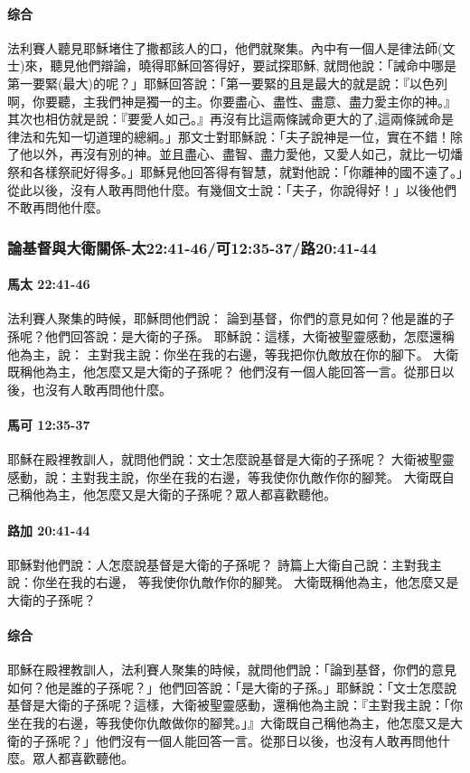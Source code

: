 \paragraph{综合}
法利賽人聽見耶穌堵住了撒都該人的口，他們就聚集。內中有一個人是律法師(文士)來，聽見他們辯論，曉得耶穌回答得好，要試探耶穌, 就問他說：「誡命中哪是第一要緊(最大)的呢？」耶穌回答說：「第一要緊的且是最大的就是說：『以色列啊，你要聽，主我們神是獨一的主。你要盡心、盡性、盡意、盡力愛主你的神。』其次也相仿就是說：『要愛人如己。』再沒有比這兩條誡命更大的了,這兩條誡命是律法和先知一切道理的總綱。」那文士對耶穌說：「夫子說神是一位，實在不錯！除了他以外，再沒有別的神。並且盡心、盡智、盡力愛他，又愛人如己，就比一切燔祭和各樣祭祀好得多。」耶穌見他回答得有智慧，就對他說：「你離神的國不遠了。」從此以後，沒有人敢再問他什麼。有幾個文士說：「夫子，你說得好！」以後他們不敢再問他什麼。


\subsubsection{論基督與大衛關係-太22:41-46/可12:35-37/路20:41-44}
\paragraph{馬太 22:41-46}
法利賽人聚集的時候，耶穌問他們說：
論到基督，你們的意見如何？他是誰的子孫呢？他們回答說：是大衛的子孫。
耶穌說：這樣，大衛被聖靈感動，怎麼還稱他為主，說：
主對我主說：你坐在我的右邊，等我把你仇敵放在你的腳下。
大衛既稱他為主，他怎麼又是大衛的子孫呢？
他們沒有一個人能回答一言。從那日以後，也沒有人敢再問他什麼。
\paragraph{馬可 12:35-37}
耶穌在殿裡教訓人，就問他們說：文士怎麼說基督是大衛的子孫呢？
大衛被聖靈感動，說：主對我主說，你坐在我的右邊，等我使你仇敵作你的腳凳。
大衛既自己稱他為主，他怎麼又是大衛的子孫呢？眾人都喜歡聽他。
\paragraph{路加 20:41-44}
耶穌對他們說：人怎麼說基督是大衛的子孫呢？
詩篇上大衛自己說：主對我主說：你坐在我的右邊，
等我使你仇敵作你的腳凳。
大衛既稱他為主，他怎麼又是大衛的子孫呢？
\paragraph{综合}
耶穌在殿裡教訓人，法利賽人聚集的時候，就問他們說：「論到基督，你們的意見如何？他是誰的子孫呢？」他們回答說：「是大衛的子孫。」耶穌說：「文士怎麼說基督是大衛的子孫呢？這樣，大衛被聖靈感動，還稱他為主說：『主對我主說：「你坐在我的右邊，等我使你仇敵做你的腳凳。」』大衛既自己稱他為主，他怎麼又是大衛的子孫呢？」他們沒有一個人能回答一言。從那日以後，也沒有人敢再問他什麼。眾人都喜歡聽他。


